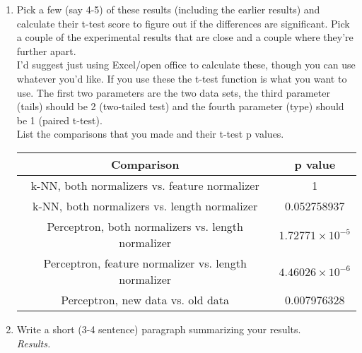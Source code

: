 \documentclass[11pt, oneside]{article}   	%
\begin{document}
\begin{enumerate}
\item
Pick a few (say 4-5) of these results (including the earlier results) and calculate their t-test
score to figure out if the differences are significant. Pick a couple of the experimental results
that are close and a couple where they're further apart.\\
I'd suggest just using Excel/open office to calculate these, though you can use whatever you'd
like. If you use these the t-test function is what you want to use. The first two parameters
are the two data sets, the third parameter (tails) should be 2 (two-tailed test) and the fourth
parameter (type) should be 1 (paired t-test).\\
List the comparisons that you made and their t-test p values. \\

\begin{center}
\begin{tabular} {| c | c |}
	\hline
	Comparison & p value\\
	\hline
	k-NN, both normalizers vs. feature normalizer & 1\\
	k-NN, both normalizers vs. length normalizer & 0.052758937\\
	Perceptron, both normalizers vs. length normalizer & $1.72771 \times 10^{-5}$\\
	Perceptron, feature normalizer vs. length normalizer & $4.46026 \times 10^{-6}$\\
	Perceptron, new data vs. old data & 0.007976328\\
	\hline
\end{tabular}
\end{center}

\item
Write a short (3-4 sentence) paragraph summarizing your results. \\

\textit{Results.} 

\end{enumerate}
\end{document}
